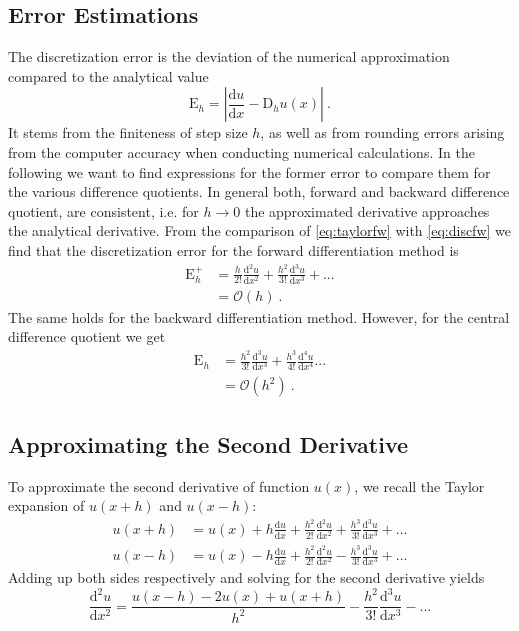 \subsection{Error Estimations}
The discretization error is the deviation of the numerical approximation compared to the analytical value
\begin{equation}
  \mathrm{E}_h = |\frac{\mathrm{d} u}{\mathrm{d} x} - \mathrm{D}_h u(x)|~.
\end{equation}
It stems from the finiteness of step size $h$, as well as from rounding errors arising from the computer accuracy when conducting numerical calculations. In the following we want to find expressions for the former error to compare them for the various difference quotients.
In general both, forward and backward difference quotient, are consistent, i.e. for $h \rightarrow 0$ the approximated derivative approaches the analytical derivative. From the comparison of \ref{eq:taylorfw} with \ref{eq:discfw} we find that the discretization error for the forward differentiation method is
\begin{align}
  \mathrm{E}^+_h &= \frac{h}{2!} \frac{\mathrm{d}^2 u}{\mathrm{d} x^2} + \frac{h^2}{3!} \frac{\mathrm{d}^3 u}{\mathrm{d} x^3} + ... \\
  &= \mathcal{O}(h)~.
\end{align}
The same holds for the backward differentiation method.
However, for the central difference quotient we get
\begin{align}
\mathrm{E}_h &= \frac{h^2}{3!} \frac{\mathrm{d}^3 u}{\mathrm{d} x^3} + \frac{h^3}{4!} \frac{\mathrm{d}^4 u}{\mathrm{d} x^4}... \\
&= \mathcal{O}(h^2)~.
\end{align}
\subsection{Approximating the Second Derivative}
To approximate the second derivative of function $u(x)$, we recall the Taylor expansion of $u(x+h)$ and $u(x-h)$:
\begin{align}
  u(x+h) &= u(x) + h \frac{\mathrm{d} u}{\mathrm{d} x} + \frac{h^2}{2!} \frac{\mathrm{d}^2 u}{\mathrm{d} x^2} + \frac{h^3}{3!} \frac{\mathrm{d}^3 u}{\mathrm{d} x^3} + ... \\
  u(x-h) &= u(x) - h \frac{\mathrm{d} u}{\mathrm{d} x} + \frac{h^2}{2!} \frac{\mathrm{d}^2 u}{\mathrm{d} x^2} - \frac{h^3}{3!} \frac{\mathrm{d}^3 u}{\mathrm{d} x^3} + ...
\end{align}
Adding up both sides respectively and solving for the second derivative yields
\begin{equation}
  \frac{\mathrm{d}^2 u}{\mathrm{d} x^2} = \frac{u(x-h) - 2 u(x) + u(x+h)}{h^2} - \frac{h^2}{3!} \frac{\mathrm{d}^3 u}{\mathrm{d} x^3} - ...
\end{equation}

